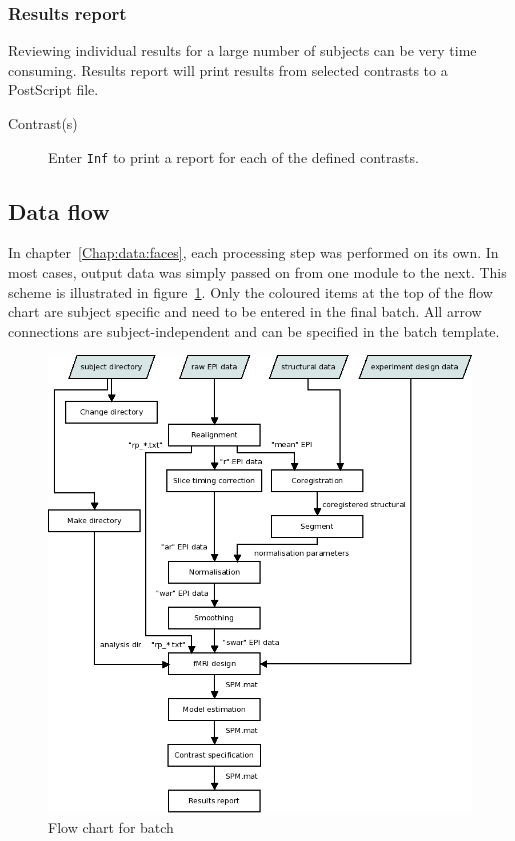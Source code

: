 \subsubsection*{Results report}

Reviewing individual results for a large number of subjects can be very time
consuming. Results report will print results from selected contrasts to a
PostScript file. 
  
\begin{description}
\item[Contrast(s)] Enter \verb|Inf| to print a report for each of the
  defined contrasts.
\end{description}

\subsection{Data flow}

In chapter~\ref{Chap:data:faces}, each processing step was performed on its own. In
most cases, output data was simply passed on from one module to the next. This
scheme is illustrated in figure~\ref{fig:flow}. Only the coloured items at the
top of the flow chart are subject specific and need to be entered in the final
batch. All arrow connections are subject-independent and can be specified in
the batch template.

\begin{figure}
  \centering
  \includegraphics[width=.9\linewidth]{batch/flow}
  \caption{Flow chart for batch}
  \label{fig:flow}
\end{figure}

